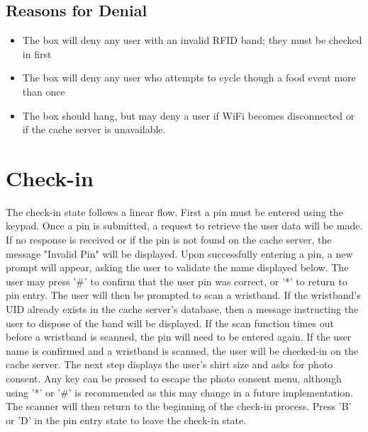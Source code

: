 \documentclass{article}
\begin{document}
\subsection{Reasons for Denial}
\begin{itemize}
	\item The box will deny any user with an invalid RFID band; they must be checked in first
	\item The box will deny any user who attempts to cycle though a food event more than once
	\item The box should hang, but may deny a user if WiFi becomes disconnected or if the cache server is unavailable.
\end{itemize}

\section{Check-in}
The check-in state follows a linear flow.  First a pin must be entered using the keypad.  Once a pin is submitted, a request to retrieve the user data will be made.  If no response is received or if the pin is not found on the cache server, the message "Invalid Pin" will be displayed.  Upon successfully entering a pin, a new prompt will appear, asking the user to validate the name displayed below.  The user may press '\#' to confirm that the user pin was correct, or '*' to return to pin entry.  The user will then be prompted to scan a wristband.  If the wristband's UID already exists in the cache server's database, then a message instructing the user to dispose of the band will be displayed.  If the scan function times out before a wristband is scanned, the pin will need to be entered again. If the user name is confirmed and a wristband is scanned, the user will be checked-in on the cache server.  The next step displays the user's shirt size and asks for photo consent.  Any key can be pressed to escape the photo consent menu, although using '*' or '\#' is recommended as this may change in a future implementation.  The scanner will then return to the beginning of the check-in process.  Press 'B' or 'D' in the pin entry state to leave the check-in state. 
\end{document}
